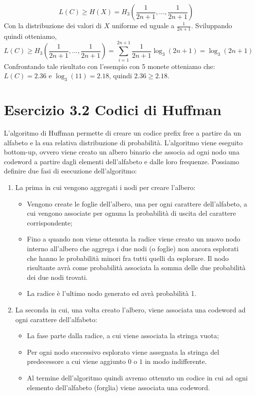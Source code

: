 \documentclass{article}
\begin{document}
\begin{enumerate}[(a)]
    \begin{equation}
        L(C) \geq H(X) = H_3\left(\frac{1}{2n+1},...,\frac{1}{2n+1}\right)
    \end{equation}
    Con la distribuzione dei valori di $X$ uniforme ed uguale a $\frac{1}{2n+1}$. Sviluppando quindi otteniamo,
    \begin{equation}
        L(C) \geq H_3\left(\frac{1}{2n+1},...,\frac{1}{2n+1}\right) = \sum^{2n+1}_{i = 1} \frac{1}{2n+1}\log_3(2n+1) = \log_3(2n+1)
    \end{equation}
    Confrontando tale risultato con l'esempio con 5 monete otteniamo che: $L(C)=2.36$ e $ \log_3(11)=2.18$, quindi $2.36\geq 2.18$.
\end{enumerate}

\section*{Esercizio 3.2 Codici di Huffman}
L'algoritmo di Huffman permette di creare un codice prefix free a partire da un alfabeto e la sua relativa distribuzione di probabilità. L'algoritmo viene eseguito bottom-up, ovvero viene creato un albero binario che associa ad ogni nodo una codeword a partire dagli elementi dell'alfabeto e dalle loro frequenze. Possiamo definire due fasi di esecuzione dell'algoritmo:
\begin{enumerate}
    \item La prima in cui vengono aggregati i nodi per creare l'albero:
    \begin{itemize}
        \item Vengono create le foglie dell'albero, una per ogni carattere dell'alfabeto, a cui vengono associate per ognuna la probabilità di uscita del carattere corrispondente;
        \item Fino a quando non viene ottenuta la radice viene creato un nuovo nodo interno all'albero che aggrega i due nodi (o foglie) non ancora esplorati che hanno le probabilità minori fra tutti quelli da esplorare. Il nodo risultante avrà come probabilità associata la somma delle due probabilità dei due nodi trovati.
        \item La radice è l'ultimo nodo generato ed avrà probabilità 1.
    \end{itemize}
    \item La seconda in cui, una volta creato l'albero, viene associata una codeword ad ogni carattere dell'alfabeto:
    \begin{itemize}
        \item La fase parte dalla radice, a cui viene associata la stringa vuota;
        \item Per ogni nodo successivo esplorato viene assegnata la stringa del predecessore a cui viene aggiunto $0$ o $1$ in modo indifferente.
        \item Al termine dell'algoritmo quindi avremo ottenuto un codice in cui ad ogni elemento dell'alfabeto (forglia) viene associata una codeword.
    \end{itemize}
\end{enumerate}
\end{document}
